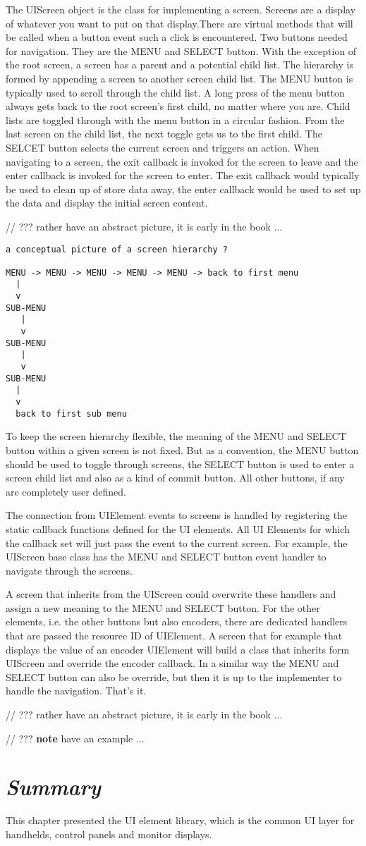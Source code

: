 The UIScreen object is the class for implementing a screen. Screens are a display of whatever you want to put on that display.There are virtual methods that will be called when a button event such a click is encountered. Two buttons needed for navigation. They are the MENU and SELECT button. With the exception of the root screen, a screen has a parent and a potential child list. The hierarchy is formed by appending a screen to another screen child list. The MENU button is typically used to scroll through the child list. A long press of the menu button always gets back to the root screen's first child, no matter where you are. Child lists are toggled through with the menu button in a circular fashion. From the last screen on the child list, the next toggle gets us to the first child. The SELCET button selects the current screen and triggers an action. When navigating to a screen, the exit callback is invoked for the screen to leave and the enter callback is invoked for the screen to enter. The exit callback would typically be used to clean up of store data away, the enter callback would be used to set up the data and display the initial screen content.

// ??? rather have an abstract picture, it is early in the book ...


\lstset{language=c++, style=codesnippetstyle}
\begin{lstlisting}
a conceptual picture of a screen hierarchy ?

MENU -> MENU -> MENU -> MENU -> MENU -> back to first menu
  |
  v
SUB-MENU
   |
   v
SUB-MENU
   |
   v
SUB-MENU
  |
  v
  back to first sub menu
\end{lstlisting}
\FloatBarrier

To keep the screen hierarchy flexible, the meaning of the MENU and SELECT button within a given screen is not fixed. But as a convention, the MENU button should be used to toggle through screens, the SELECT button is used to enter a screen child list and also as a kind of commit button. All other buttons, if any are completely user defined.

The connection from UIElement events to screens is handled by registering the static callback functions defined for the UI elements. All UI Elements for which the callback set will just pass the event to the current screen. For example, the UIScreen base class has the MENU and SELECT button event handler to navigate through the screens.

A screen that inherits from the UIScreen could overwrite these handlers and assign a new meaning to the MENU and SELECT button. For the other elements, i.e. the other buttons but also encoders, there are dedicated handlers that are passed the resource ID of UIElement. A screen that for example that displays the value of an encoder UIElement will build a class that inherits form UIScreen and override the encoder callback. In a similar way the MENU and SELECT button can also be override, but then it is up to the implementer to handle the navigation. That's it.

// ??? rather have an abstract picture, it is early in the book ...

// ??? \textbf{note} have an example ...

\section{\textit{Summary}}

This chapter presented the UI element library, which is the common UI layer for handhelds, control panels and monitor displays.
